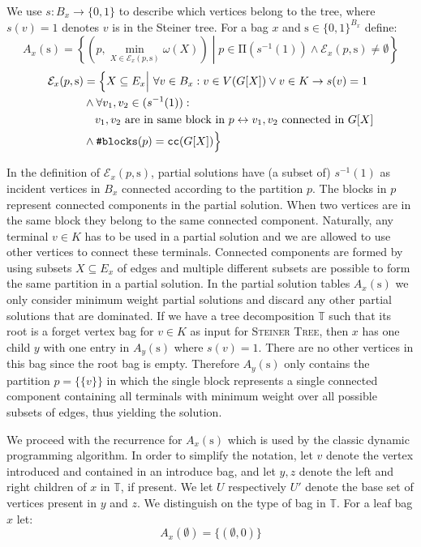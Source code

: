 \documentclass{llncs}
\begin{document}
We use $s: B_{x}\rightarrow \{0,1\}$ to describe which vertices belong to the tree, where $s(v) = 1$ denotes $v$ is in the Steiner tree.
For a bag $x$ and $\mathrm{s} \in \{0,1\}^{B_{x}}$ define:
\[
A_{x}(\mathrm{s})= \left\{ \left( p, \min_{X\in \mathcal{E}_{x}(p, \mathrm{s})} \omega(X) \right) \middle| p \in \mathrm{\Pi}(s^{-1}(1)) \wedge \mathcal{E}_{x}(p, \mathrm{s}) \neq \emptyset  \right\}
\]
\[
\begin{split}
\mathcal{E}_{x}(p, \mathrm{s} )  &= \Big\{ X \subseteq E_{x} \Big| \mbox{ }\forall v \in B_{x} : v \in V(G[X]) \vee v \in K \rightarrow s(v) = 1   \\
&\wedge \forall v_{1},v_{2} \in (s^{-1}(1)) : \\
& \quad v_{1},v_{2} \mbox{ are in same block in } p \leftrightarrow v_{1},v_{2} \mbox{ connected in } G[X] \\
&\wedge \mbox{\texttt{\#blocks}}(p) = \mbox{\texttt{cc}}(G[X])\Big\}
\end{split}
\]



In the definition of $\mathcal{E}_{x}(p,\mathrm{s})$,
partial solutions have (a subset of) $s^{-1}(1)$ as incident vertices in $B_{x}$ connected according to the partition $p$. The blocks in $p$ represent connected components in the partial solution. When two vertices are in the same block they belong to
the same connected component. Naturally,
any terminal $v \in K$ has to be used in a partial solution and we are allowed to use other vertices to connect these terminals. Connected components are formed by using subsets $X \subseteq E_{x}$ of edges and multiple different subsets are possible to form the same partition in a partial solution. In the partial solution tables $A_{x}(\mathrm{s})$ we only consider minimum weight partial solutions and discard any other partial solutions that are dominated. If we have a tree decomposition $\mathbb{T}$ such that its root is a forget vertex bag for $v \in K$ as input for \textsc{Steiner Tree}, then $x$ has one child $y$ with one entry in $A_{y}(\mathrm{s})$ where $s(v) = 1$. There are no other vertices in this bag since the root bag is empty.
Therefore $A_{y}(\mathrm{s})$ only contains the partition $p = \{ \{ v \} \}$ in which the single block represents a single connected component containing all terminals with minimum weight over all possible subsets of edges, thus yielding the solution.

We proceed with the recurrence for $A_{x}(\mathrm{s})$ which is used by the classic dynamic programming algorithm. In order to simplify the notation, let $v$ denote the vertex introduced and contained in an introduce bag, and let $y, z$ denote the left and right children of $x$ in $\mathbb{T}$, if present. We let $U$ respectively $U'$ denote the base set of vertices present in $y$ and $z$. We distinguish on the type of bag in $\mathbb{T}$. For a leaf bag $x$ let:
\[
A_{x}( \emptyset ) = \big\{(\emptyset, 0) \big\}
\]
\end{document}
